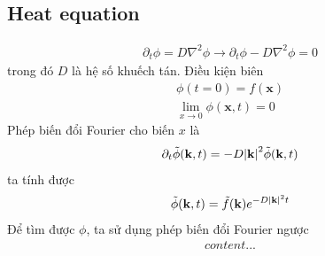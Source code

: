 \documentclass{article}
\begin{document}
\subsection{Heat equation}
\begin{gather}
	\partial_{t} \phi = D \nabla^{2} \phi \rightarrow \partial_{t} \phi - D \nabla^{2} \phi = 0
\end{gather}
trong đó $D$ là hệ số khuếch tán. Điều kiện biên
\begin{equation}
	\begin{aligned}
		\phi(t =0) = f(\mathbf{x})\\
		\lim\limits_{x \rightarrow 0} \phi(\mathbf{x} , t) = 0
	\end{aligned}
\end{equation}
Phép biến đổi Fourier cho biến $x$ là
\begin{gather}
	\partial_{t} \tilde{\phi}(\mathbf{k},t) = -D \abs{\mathbf{k}}^{2} \tilde{\phi}(\mathbf{k},t)
\end{gather}
ta tính được
\begin{gather}
	\tilde{\phi}(\mathbf{k},t) = \tilde{f}(\mathbf{k}) e^{-D \abs{\mathbf{k}}^{2} t}
\end{gather}
Để tìm được $\phi$, ta sử dụng phép biến đổi Fourier ngược
\begin{gather}
	content...
\end{gather}
\end{document}
